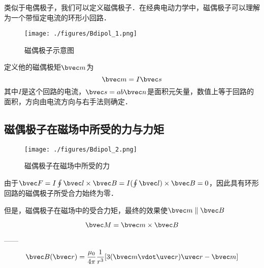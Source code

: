 
\begin{issues}
\issueDraft
\end{issues}
类似于电偶极子，我们可以定义磁偶极子．在经典电动力学中，磁偶极子可以理解为一个带恒定电流的环形小回路．
\begin{figure}[ht]
\centering
\texttt{[image: ./figures/Bdipol\_1.png]}
\caption{磁偶极子示意图} \label{Bdipol_fig1}
\end{figure}

定义他的磁偶极矩$\bvec m$为
\begin{equation}
\bvec m = I \bvec s
\end{equation}
其中$I$是这个回路的电流，$\bvec s = ab\bvec n$是面积元矢量，数值上等于回路的面积，方向由电流方向与右手法则确定．

\subsection{磁偶极子在磁场中所受的力与力矩}
\begin{figure}[ht]
\centering
\texttt{[image: ./figures/Bdipol\_2.png]}
\caption{磁偶极子在磁场中所受的力} \label{Bdipol_fig2}
\end{figure}
由于$\bvec F = I \oint \bvec l \times \bvec B = I (\oint \bvec l) \times \bvec B = 0$，因此具有环形回路的磁偶极子所受合力始终为零．

但是，磁偶极子在磁场中的受合力矩，最终的效果使$\bvec m \parallel \bvec B$

\begin{equation}
\bvec M = \bvec m \times \bvec B
\end{equation}

------
\begin{equation}
\bvec B(\bvec r) = \frac{\mu_0}{4\pi} \frac{1}{r^3} [3(\bvec m \vdot \uvec r) \uvec r - \bvec m]
\end{equation}
